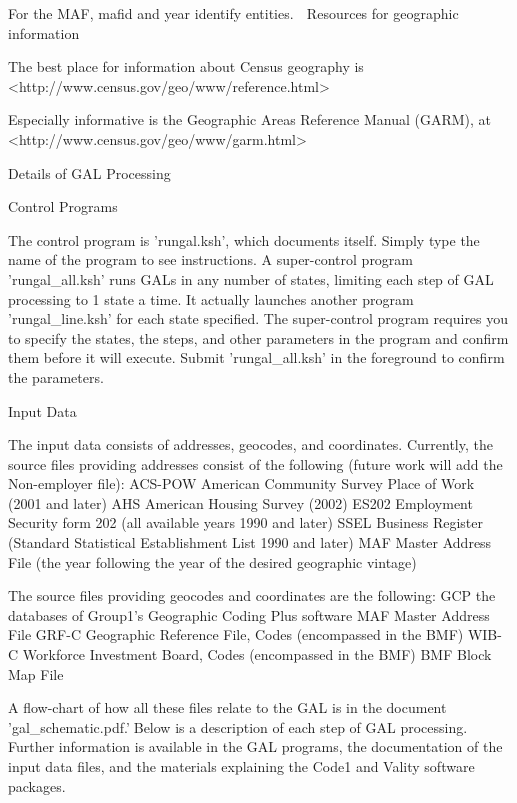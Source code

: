 For the MAF, mafid and year identify entities. 
              Resources for geographic information

The best place for information about Census geography is 
<http://www.census.gov/geo/www/reference.html>

Especially informative is the Geographic Areas Reference Manual (GARM), at
<http://www.census.gov/geo/www/garm.html>



                   Details of GAL Processing

                        Control Programs

The control program is 'rungal.ksh', which documents itself. Simply type the name of the program to see
instructions. A super-control program 'rungal_all.ksh' runs GALs in any number of states, limiting each
step of GAL processing to 1 state a time. It actually launches another program 'rungal_line.ksh' for each
state specified. The super-control program requires you to specify the states,  the steps, and other
parameters in the program and confirm them before it will execute. Submit 'rungal_all.ksh' in the
foreground to confirm the parameters.

                           Input Data

The input data consists of addresses, geocodes, and coordinates. Currently, the source files providing
addresses consist of the following (future work will add the Non-employer file):
ACS-POW   American Community Survey Place of Work (2001 and later)
AHS       American Housing Survey (2002)
ES202          Employment Security form 202 (all available years 1990 and later)
SSEL      Business Register (Standard Statistical Establishment List 1990 and later)
MAF       Master Address File (the year following the year of the desired geographic vintage)

The source files providing geocodes and coordinates are the following:
GCP       the databases of Group1's Geographic Coding Plus software
MAF       Master Address File
GRF-C          Geographic Reference File, Codes (encompassed in the BMF)
WIB-C          Workforce Investment Board, Codes (encompassed in the BMF)
BMF       Block Map File

A flow-chart of how all these files relate to the GAL is in the document 'gal_schematic.pdf.'Below is a description of each step of GAL processing. Further information is available in the GAL
programs, the documentation of the input data files, and the materials explaining the Code1 and Vality
software packages. 

